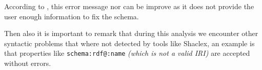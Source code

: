 According to \cite{heeren2005top}, this error message nor can be improve as it does not provide the user enough information to fix the schema.

Then also it is important to remark that during this analysis we encounter other syntactic problems that where not detected by tools like Shaclex,
an example is that properties like \texttt{schema:rdf@:name} \textit{(which is not a valid IRI)} are accepted without errors.

\begin{table}
  \centering
  \caption{Detection of the different syntactic errors by the current existing ShEx tools that syntactically analyse the
  shape expressions.}
  \label{tb:sintactic-errors}
\end{table}
